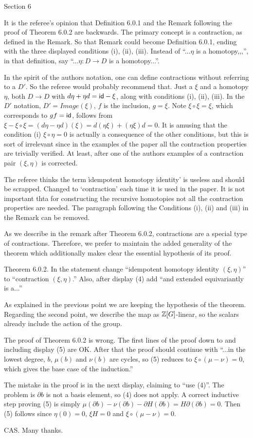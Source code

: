 Section 6

\subitem It is the referee's opinion that Definition 6.0.1 and the Remark following the proof of Theorem 6.0.2 are backwards. The primary concept is a contraction, as defined in the Remark. So that Remark could become Definition 6.0.1, ending with the three displayed conditions (i), (ii), (iii). Instead of ``...$\eta$ is a homotopy,,,'', in that definition, say ``...$\eta\colon D\to D$ is a homotopy...''.

In the spirit of the authors notation, one can define contractions without referring to a $D'$. So the referee would probably recommend that. Just a $\xi$ and a homotopy $\eta$, both $D\to D$ with $d\eta+\eta d = \mathsf{id}-\xi$, along with conditions (i), (ii), (iii). In the $D'$ notation, $D' = Image(\xi)$, $f$ is the inclusion, $g = \xi$. Note $\xi\circ\xi = \xi$, which corresponds to $gf=\mathsf{id}$, follows from $\xi-\xi\circ\xi = (d\eta-\eta d)(\xi) = d(\eta\xi) + (\eta\xi)d = 0$. It is amusing that the condition (i) $\xi\circ\eta=0$ is actually a consequence of the other conditions, but this is sort of irrelevant since in the examples of the paper all the contraction properties are trivially verified. At least, after one of the authors examples of a contraction pair $(\xi,\eta)$ is corrected.

The referee thinks the term ìdempotent homotopy identity' is useless and should be scrapped.
Changed to `contraction' each time it is used in the paper. It is not important thta for constructing the recursive homotopies not all the contraction properties are needed. The paragraph following the Conditions (i), (ii) and (iii) in the Remark can be removed.

\ar As we describe in the remark after Theorem 6.0.2, contractions are a special type of contractions.
Therefore, we prefer to maintain the added generality of the theorem which additionally makes clear the essential hypothesis of its proof.

\subitem Theorem 6.0.2. In the statement change ``idempotent homotopy identity $(\xi,\eta)$'' to ``contraction $(\xi,\eta)$.'' Also, after display (4) add ``and extended equivariantly is a...''

\ar As explained in the previous point we are keeping the hypothesis of the theorem.
Regarding the second point, we describe the map as $\mathbb{Z}[G]$-linear, so the scalars already include the action of the group.

\subitem The proof of Theorem 6.0.2 is wrong. The first lines of the proof down to and including display (5) are OK. After that the proof should continue with ``...in the lowest degree, $b$, $\mu(b)$ and $\nu(b)$ are cycles, so (5) reduces to $\xi\circ (\mu-\nu) = 0$, which gives the base case of the induction.''

The mistake in the proof is in the next display, claiming to ``use (4)''.
The problem is $\partial b$ is not a basis element, so (4) does not apply.
A correct inductive step proving (5) is simply
$\mu(\partial b) - \nu(\partial b) - \partial H(\partial b) = H\partial(\partial b) = 0.$ Then (5) follows since $\eta(0) = 0$, $\xi H=0$ and $\xi\circ (\mu-\nu) = 0$.

\ar CAS. Many thanks.
